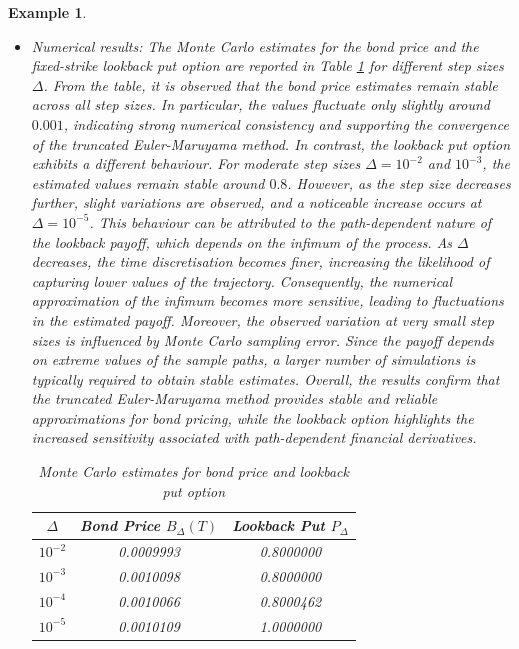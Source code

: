 \documentclass[11pt]{article}
\newtheorem{example}[definition]{Example}
\begin{document}
\begin{example}
\begin{itemize}
\item Numerical results: The Monte Carlo estimates for the bond price and the fixed-strike lookback put option are reported in Table \ref{Tab:table5} for different step sizes $\Delta$. From the table, it is observed that the bond price estimates remain stable across all step sizes. In particular, the values fluctuate only slightly around $0.001$, indicating strong numerical consistency and supporting the convergence of the truncated Euler-Maruyama method. In contrast, the lookback put option exhibits a different behaviour. For moderate step sizes $\Delta = 10^{-2}$ and $10^{-3}$, the estimated values remain stable around $0.8$. However, as the step size decreases further, slight variations are observed, and a noticeable increase occurs at $\Delta = 10^{-5}$. This behaviour can be attributed to the path-dependent nature of the lookback payoff, which depends on the infimum of the process. As $\Delta$ decreases, the time discretisation becomes finer, increasing the likelihood of capturing lower values of the trajectory. Consequently, the numerical approximation of the infimum becomes more sensitive, leading to fluctuations in the estimated payoff. Moreover, the observed variation at very small step sizes is influenced by Monte Carlo sampling error. Since the payoff depends on extreme values of the sample paths, a larger number of simulations is typically required to obtain stable estimates. Overall, the results confirm that the truncated Euler-Maruyama method provides stable and reliable approximations for bond pricing, while the lookback option highlights the increased sensitivity associated with path-dependent financial derivatives.

\vspace{0.1em}

\begin{table}[!htbp]
\centering
\begin{tabular}{ccc}
\hline
$\Delta$ & Bond Price $B_{\Delta}(T)$ & Lookback Put $P_{\Delta}$ \\
\hline
$10^{-2}$ & 0.0009993 & 0.8000000 \\
$10^{-3}$ & 0.0010098 & 0.8000000 \\
$10^{-4}$ & 0.0010066 & 0.8000462 \\
$10^{-5}$ & 0.0010109 & 1.0000000 \\
\hline
\end{tabular}
\caption{Monte Carlo estimates for bond price and lookback put option}
\label{Tab:table5}
\end{table}
\end{itemize}
\end{example}
\end{document}
